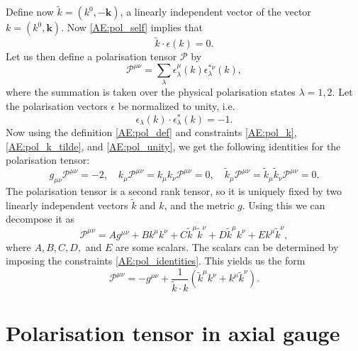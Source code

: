 \documentclass[a4paper, twoside, english, 12pt]{report}
\begin{document}
Define now $\tilde{k}=(k^0,-\mathbf{k})$, a linearly independent vector of the vector $k=(k^0,\mathbf{k})$. Now \eqref{AE:pol_self} implies that
\begin{equation}\label{AE:pol_k_tilde}
	\tilde{k}\cdot\epsilon(k) =0.
\end{equation}
Let us then define a polarisation tensor $\mathcal{P}$ by
\begin{equation}\label{AE:pol_def}
\mathcal{P}^{\mu\nu} = \sum\limits_{\lambda} \epsilon^\mu_\lambda(k)\epsilon^{*\nu}_\lambda(k),
\end{equation}
where the summation is taken over the physical polarisation states $\lambda=1,2$. Let the polarisation vectors $\epsilon$ be normalized to unity, i.e.
\begin{equation}\label{AE:pol_unity}
\epsilon_\lambda(k)\cdot \epsilon^{*}_\lambda(k)=-1.
\end{equation}
Now using the definition \eqref{AE:pol_def} and constraints \eqref{AE:pol_k}, \eqref{AE:pol_k_tilde}, and \eqref{AE:pol_unity}, we get the following identities for the polarisation tensor:
\begin{equation}\label{AE:pol_identities}
g_{\mu\nu}\mathcal{P}^{\mu\nu}=-2, \quad k_{\mu}\mathcal{P}^{\mu\nu}=k_{\mu}k_{\nu}\mathcal{P}^{\mu\nu}= 0 , \quad \tilde{k}_{\mu}\mathcal{P}^{\mu\nu}=\tilde{k}_{\mu}\tilde{k}_{\nu}\mathcal{P}^{\mu\nu}= 0 .
\end{equation}
The polarisation tensor is a second rank tensor, so it is uniquely fixed by two linearly independent vectors $\tilde{k}$ and $k$, and the metric $g$. Using this we can decompose it as
\begin{equation}\label{AE:pol_ten_dec}
\mathcal{P}^{\mu\nu} = Ag^{\mu\nu} + Bk^{\mu}k^{\nu}+ C\tilde{k}^{\mu}\tilde{k}^{\nu} + D\tilde{k}^{\mu}k^{\nu} + Ek^{\mu}\tilde{k}^{\nu},
\end{equation}
where $A,B,C,D,$ and $E$ are some scalars. The scalars can be determined by imposing the constraints \eqref{AE:pol_identities}. This yields us the form
\begin{equation}
\mathcal{P}^{\mu\nu} = -g^{\mu\nu} + \frac{1}{\tilde{k}\cdot k}\left(\tilde{k}^{\mu}k^{\nu} + k^{\mu}\tilde{k}^{\nu}\right).
\end{equation}

\clearpage
\section{Polarisation tensor in axial gauge}\label{AS:axial_polarization_tensor}
\end{document}
